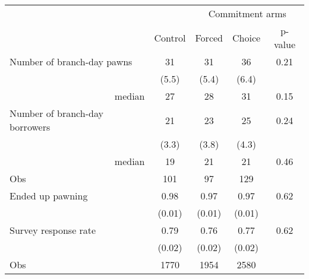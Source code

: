 \begin{tabular}{lcccc}
\toprule
      &       & \multicolumn{3}{c}{Commitment arms} \\
\cmidrule{3-5}      & Control & Forced & Choice & p-value \\
\midrule
\midrule
Number of branch-day pawns & 31    & 31    & 36    & 0.21 \\
      & (5.5) & (5.4) & (6.4) &  \\
\multicolumn{1}{r}{median} & 27    & 28    & 31    & 0.15 \\
\midrule
Number of branch-day borrowers & 21    & 23    & 25    & 0.24 \\
      & (3.3) & (3.8) & (4.3) &  \\
\multicolumn{1}{r}{median} & 19    & 21    & 21    & 0.46 \\
\midrule
Obs   & 101   & 97    & 129   &  \\
\midrule
\midrule
\multicolumn{1}{p{15.82em}}{Ended up pawning} & 0.98  & 0.97  & 0.97  & 0.62 \\
      & (0.01) & (0.01) & (0.01) &  \\
Survey response rate & 0.79  & 0.76  & 0.77  & 0.62 \\
      & (0.02) & (0.02) & (0.02) &  \\
\midrule
Obs   & 1770  & 1954  & 2580  &  \\
\bottomrule
\bottomrule
\end{tabular}%
